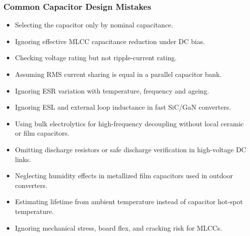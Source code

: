 \begin{frame}
\frametitle{Common Capacitor Design Mistakes}

\begin{itemize}
    \item Selecting the capacitor only by nominal capacitance.

    \item Ignoring effective MLCC capacitance reduction under DC bias.

    \item Checking voltage rating but not ripple-current rating.

    \item Assuming RMS current sharing is equal in a parallel capacitor bank.

    \item Ignoring ESR variation with temperature, frequency and ageing.

    \item Ignoring ESL and external loop inductance in fast SiC/GaN converters.

    \item Using bulk electrolytics for high-frequency decoupling without local ceramic or film capacitors.

    \item Omitting discharge resistors or safe discharge verification in high-voltage DC links.

    \item Neglecting humidity effects in metallized film capacitors used in outdoor converters.

    \item Estimating lifetime from ambient temperature instead of capacitor hot-spot temperature.

    \item Ignoring mechanical stress, board flex, and cracking risk for MLCCs.
\end{itemize}

\end{frame}


